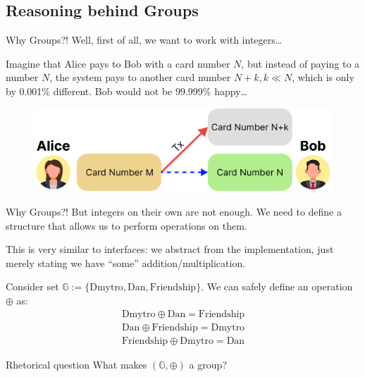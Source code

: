 \documentclass{beamer}
\begin{document}
    \subsection{Reasoning behind Groups}
    \begin{frame}{Why Groups?!}
        Well, first of all, we want to work with integers\ldots

        Imagine that Alice pays to Bob with a card number $N$, but instead of paying to a number $N$, the system pays 
        to another card number $N+k, k \ll N$, which is only by 0.001\% different. Bob would not be 99.999\% happy\ldots

        \begin{figure}
          \includegraphics[width=1.0\textwidth]{images/lecture_1/why_integers.pdf}
          \label{fig:why_integers}
        \end{figure}
    \end{frame}

    \begin{frame}{Why Groups?!}
        But integers on their own are not enough. We need to define a structure that allows us to perform operations on them.

        This is very similar to interfaces: we abstract from the implementation, just merely stating we have ``some'' addition/multiplication.

        \begin{example}
            Consider set $\mathbb{G} := \{\text{Dmytro}, \text{Dan}, \text{Friendship}\}$. We can safely define an operation $\oplus$ as:
            \begin{gather*}
                \text{Dmytro} \oplus \text{Dan} = \text{Friendship} \\ 
                \text{Dan} \oplus \text{Friendship} = \text{Dmytro} \\
                \text{Friendship} \oplus \text{Dmytro} = \text{Dan}
            \end{gather*}
        \end{example}

        \begin{block}{Rhetorical question}
            What makes $(\mathbb{G}, \oplus)$ a group?
        \end{block}
    \end{frame}
\end{document}
